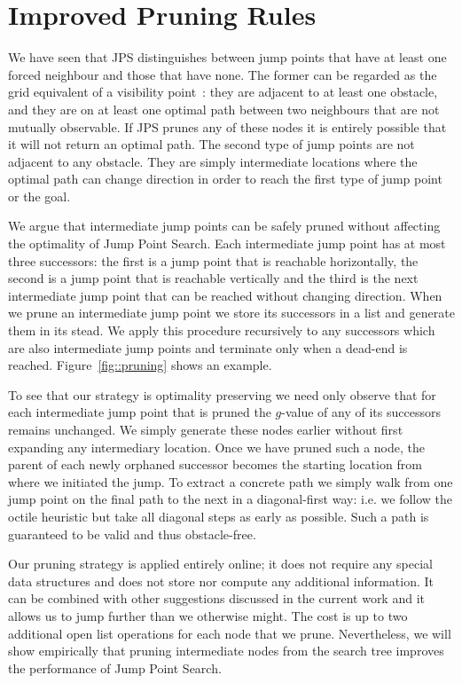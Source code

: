 \section{Improved Pruning Rules}
\label{sec::pruning}
We have seen that JPS distinguishes between jump points that have at least 
one forced neighbour and those that have none.
The former can be regarded as
the grid equivalent of a visibility point~\cite{lozanoperez79}: they are adjacent to at least one
obstacle, and they are on at least one optimal path between two neighbours
that are not mutually observable. If JPS prunes any of these nodes it is
entirely possible that it will not return an optimal path.  The second type of
jump points are not adjacent to any obstacle. They are simply intermediate
locations where the optimal path can change direction in order to reach the
first type of jump point or the goal.
\par
We argue that intermediate jump points can be safely pruned without
affecting the optimality of Jump Point Search.  
Each intermediate jump point has at most three successors: the first is a jump 
point that is reachable horizontally, the second is a jump point that is reachable 
vertically and the third is the next intermediate jump point that can be reached 
without changing direction.
When we prune an intermediate jump point we store its successors in a list and
generate them in its stead. We apply this procedure recursively to any
successors which are also intermediate jump points and terminate only when a
dead-end is reached. Figure~\ref{fig::pruning} shows an example.

To see that our strategy is optimality preserving we need only observe that
for each intermediate jump point that is pruned the $g$-value of any of its
successors remains unchanged. We simply generate these nodes earlier without
first expanding any intermediary location.  Once we have pruned such a node, 
the parent of each newly orphaned successor becomes the starting location from
where we initiated the jump. To extract a concrete path we simply walk from
one jump point on the final path to the next in a diagonal-first way: i.e. we
follow the octile heuristic but take all diagonal steps as early as possible.
Such a path is guaranteed to be valid and thus obstacle-free.

Our pruning strategy is applied entirely online; it does not require any
special data structures and does not store nor compute any additional
information.  It can be combined with other suggestions discussed in the 
current work and it allows us to jump further than we otherwise might. The 
cost is up to two additional open list operations for each node that we
prune. Nevertheless, we will show empirically that pruning intermediate nodes
from the search tree improves the performance of Jump Point Search.

